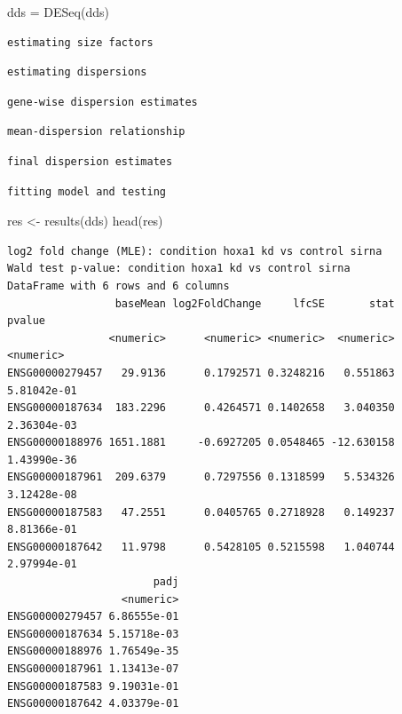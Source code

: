 \documentclass[
  letterpaper,
  DIV=11,
  numbers=noendperiod]{scrartcl}
\newenvironment{Shaded}{\begin{snugshade}}{\end{snugshade}}
\newcommand{\FunctionTok}[1]{\textcolor[rgb]{0.28,0.35,0.67}{#1}}
\newcommand{\NormalTok}[1]{\textcolor[rgb]{0.00,0.23,0.31}{#1}}
\newcommand{\OtherTok}[1]{\textcolor[rgb]{0.00,0.23,0.31}{#1}}
\begin{document}
\begin{Shaded}
\begin{Highlighting}[]
\NormalTok{dds }\OtherTok{=} \FunctionTok{DESeq}\NormalTok{(dds)}
\end{Highlighting}
\end{Shaded}

\begin{verbatim}
estimating size factors
\end{verbatim}

\begin{verbatim}
estimating dispersions
\end{verbatim}

\begin{verbatim}
gene-wise dispersion estimates
\end{verbatim}

\begin{verbatim}
mean-dispersion relationship
\end{verbatim}

\begin{verbatim}
final dispersion estimates
\end{verbatim}

\begin{verbatim}
fitting model and testing
\end{verbatim}

\begin{Shaded}
\begin{Highlighting}[]
\NormalTok{res }\OtherTok{\textless{}{-}} \FunctionTok{results}\NormalTok{(dds)}
\FunctionTok{head}\NormalTok{(res)}
\end{Highlighting}
\end{Shaded}

\begin{verbatim}
log2 fold change (MLE): condition hoxa1 kd vs control sirna 
Wald test p-value: condition hoxa1 kd vs control sirna 
DataFrame with 6 rows and 6 columns
                 baseMean log2FoldChange     lfcSE       stat      pvalue
                <numeric>      <numeric> <numeric>  <numeric>   <numeric>
ENSG00000279457   29.9136      0.1792571 0.3248216   0.551863 5.81042e-01
ENSG00000187634  183.2296      0.4264571 0.1402658   3.040350 2.36304e-03
ENSG00000188976 1651.1881     -0.6927205 0.0548465 -12.630158 1.43990e-36
ENSG00000187961  209.6379      0.7297556 0.1318599   5.534326 3.12428e-08
ENSG00000187583   47.2551      0.0405765 0.2718928   0.149237 8.81366e-01
ENSG00000187642   11.9798      0.5428105 0.5215598   1.040744 2.97994e-01
                       padj
                  <numeric>
ENSG00000279457 6.86555e-01
ENSG00000187634 5.15718e-03
ENSG00000188976 1.76549e-35
ENSG00000187961 1.13413e-07
ENSG00000187583 9.19031e-01
ENSG00000187642 4.03379e-01
\end{verbatim}
\end{document}
